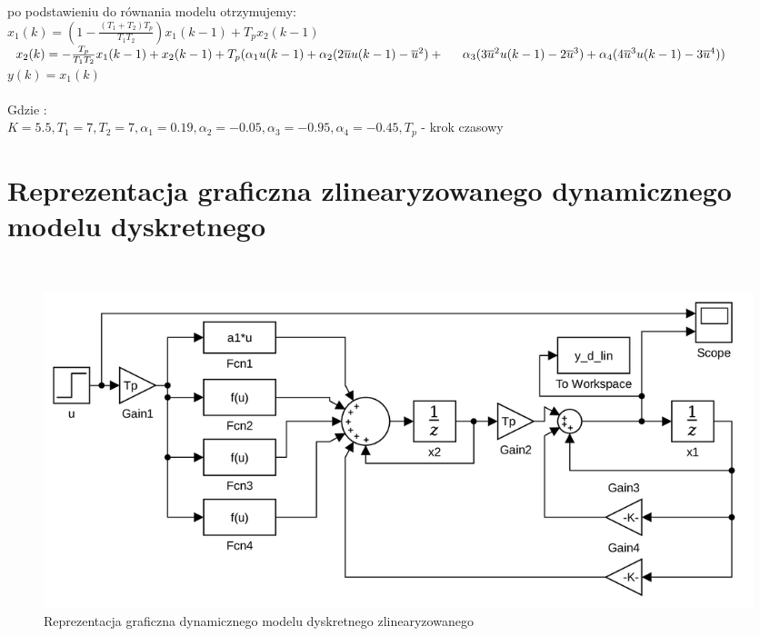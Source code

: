 \documentclass[a4paper, 11pt]{article}
\begin{document}
\noindent po podstawieniu do równania modelu otrzymujemy: 
\\

$x_1(k) =(1-\frac{(T_1 + T_2)T_p}{T_1T_2})x_1(k-1)+T_px_2(k-1) $
\\

$x_2(k) = - \frac{T_p}{T_1T_2}x_1(k-1) + x_2(k-1) + T_p(\alpha_1u(k-1)+\alpha_2(2\overline{u}u(k-1) - \overline{u}^2)+
\\ \indent \alpha_3(3\overline{u}^2u(k-1)-2\overline{u}^3) + \alpha_4(4\overline{u}^3u(k-1) - 3\overline{u}^4))$
\\

$y(k) = x_1(k)$\\
\\
Gdzie : \\

$K  = 5.5, T_1 = 7, T_2 = 7, \alpha_1 = 0.19, \alpha_2 = -0.05, \alpha_3 = -0.95, \alpha_4 = -0.45, T_p$ - krok czasowy
\\

\section{Reprezentacja graficzna zlinearyzowanego dynamicznego modelu dyskretnego}\
\begin{figure}[H]
\centering
\includegraphics[scale=0.25]{dynamiczny_model_dyskretny_zlinearyzowany.png}
\caption{Reprezentacja graficzna dynamicznego modelu dyskretnego zlinearyzowanego }
\end{figure}
\end{document}
